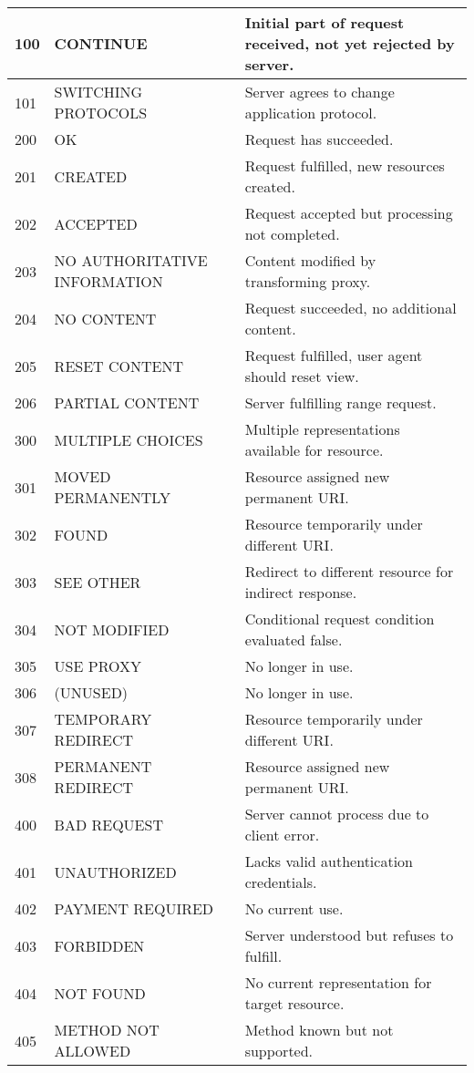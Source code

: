 \begin{longtable}{@{}>{}l >{\raggedright\arraybackslash}p{5cm} >{\raggedright\arraybackslash}p{8cm}@{}}
100 & CONTINUE & Initial part of request received, not yet rejected by server. \\ \hline
101 & SWITCHING PROTOCOLS & Server agrees to change application protocol. \\ \hline
200 & OK & Request has succeeded. \\ \hline
201 & CREATED & Request fulfilled, new resources created. \\ \hline
202 & ACCEPTED & Request accepted but processing not completed. \\ \hline
203 & NO AUTHORITATIVE INFORMATION & Content modified by transforming proxy. \\ \hline
204 & NO CONTENT & Request succeeded, no additional content. \\ \hline
205 & RESET CONTENT & Request fulfilled, user agent should reset view. \\ \hline
206 & PARTIAL CONTENT & Server fulfilling range request. \\ \hline
300 & MULTIPLE CHOICES & Multiple representations available for resource. \\ \hline
301 & MOVED PERMANENTLY & Resource assigned new permanent URI. \\ \hline
302 & FOUND & Resource temporarily under different URI. \\ \hline
303 & SEE OTHER & Redirect to different resource for indirect response. \\ \hline
304 & NOT MODIFIED & Conditional request condition evaluated false. \\ \hline
305 & USE PROXY & No longer in use. \\ \hline
306 & (UNUSED) & No longer in use. \\ \hline
307 & TEMPORARY REDIRECT & Resource temporarily under different URI. \\ \hline
308 & PERMANENT REDIRECT & Resource assigned new permanent URI. \\ \hline
400 & BAD REQUEST & Server cannot process due to client error. \\ \hline
401 & UNAUTHORIZED & Lacks valid authentication credentials. \\ \hline
402 & PAYMENT REQUIRED & No current use. \\ \hline
403 & FORBIDDEN & Server understood but refuses to fulfill. \\ \hline
404 & NOT FOUND & No current representation for target resource. \\ \hline
405 & METHOD NOT ALLOWED & Method known but not supported. \\ \hline

\end{longtable}

